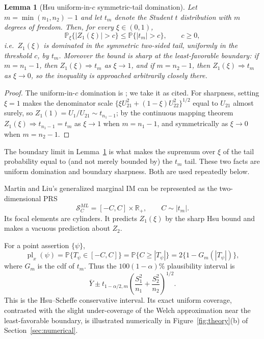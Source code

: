 \documentclass[12pt]{article}
\newtheorem{lemma}{Lemma}
\newcommand{\R}{\mathbb R}
\newcommand{\Prb}{\mathbb P}
\newcommand{\pl}{\operatorname{pl}}
\begin{document}
\begin{lemma}[Hsu uniform-in-\(c\) symmetric-tail domination]
\label{lem:hsu}
Let \(m=\min(n_1,n_2)-1\) and let \(t_m\) denote the Student
\(t\) distribution with \(m\) degrees of freedom.  Then, for every
\(\xi\in(0,1)\),
\[
\Prb_\xi\{|Z_1(\xi)|>c\}
\leq
\Prb\{|t_m|>c\},
\qquad c\geq0,
\]
i.e.\ \(Z_1(\xi)\) is dominated in the symmetric two-sided tail, uniformly in
the threshold \(c\), by \(t_m\).  Moreover the bound is sharp at the
least-favorable boundary: if \(m=n_1-1\), then \(Z_1(\xi)\Rightarrow t_m\) as
\(\xi\to1\), and if \(m=n_2-1\), then \(Z_1(\xi)\Rightarrow t_m\) as
\(\xi\to0\), so the inequality is approached arbitrarily closely there.
\end{lemma}

\begin{proof}
The uniform-in-\(c\) domination is \citet[Theorem on the two-sample
\(t\)-ratio]{Hsu1938}; we take it as cited.  For sharpness, setting \(\xi=1\)
makes the denominator scale \(\{\xi U_{21}^2+(1-\xi)U_{22}^2\}^{1/2}\) equal to
\(U_{21}\) almost surely, so \(Z_1(1)=U_1/U_{21}\sim t_{n_1-1}\); by the
continuous mapping theorem \(Z_1(\xi)\Rightarrow t_{n_1-1}=t_m\) as
\(\xi\to1\) when \(m=n_1-1\), and symmetrically as \(\xi\to0\) when
\(m=n_2-1\).
\end{proof}

The boundary limit in Lemma~\ref{lem:hsu} is what makes the supremum over
\(\xi\) of the tail probability equal to (and not merely bounded by) the
\(t_m\) tail.  These two facts are uniform domination and boundary sharpness.
Both are used repeatedly below.

Martin and Liu's generalized marginal IM can be represented as the
two-dimensional PRS
\begin{equation}
\mathcal S_C^{ML}=[-C,C]\times\R_+,
\qquad C\sim |t_m|.
\label{eq:ml-cylinder}
\end{equation}
Its focal elements are cylinders.  It predicts \(Z_1(\xi)\) by the sharp Hsu
bound and makes a vacuous prediction about \(Z_2\).

For a point assertion \(\{\psi\}\),
\[
\pl_x(\psi)
=
\Prb\{T_\psi\in[-C,C]\}
=
\Prb\{C\geq |T_\psi|\}
=
2\{1-G_m(|T_\psi|)\},
\]
where \(G_m\) is the cdf of \(t_m\).  Thus the
\(100(1-\alpha)\%\) plausibility interval is
\[
\bar Y
\pm
t_{1-\alpha/2,m}
\left(\frac{S_1^2}{n_1}+\frac{S_2^2}{n_2}\right)^{1/2}.
\]
This is the Hsu--Scheffe conservative interval.  Its exact uniform coverage,
contrasted with the slight under-coverage of the Welch approximation near the
least-favorable boundary, is illustrated numerically in
Figure~\ref{fig:theory}(b) of Section~\ref{sec:numerical}.
\end{document}
